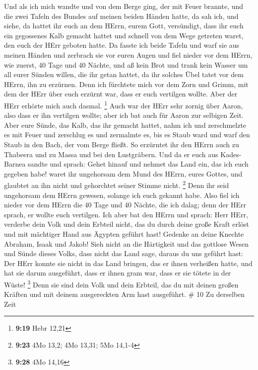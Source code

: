  Und als ich mich wandte und von dem Berge ging, der mit
Feuer brannte, und die zwei Tafeln des Bundes auf meinen beiden Händen
hatte,  da sah ich, und siehe, da hattet ihr euch an dem
HErrn, eurem Gott, versündigt, dass ihr euch ein gegossenes Kalb gemacht
hattet und schnell von dem Wege getreten waret, den euch der HErr
geboten hatte.  Da fasste ich beide Tafeln und warf sie aus
meinen Händen und zerbrach sie vor euren Augen  und fiel
nieder vor dem HErrn, wie zuerst, 40 Tage und 40 Nächte, und aß kein
Brot und trank kein Wasser um all eurer Sünden willen, die ihr getan
hattet, da ihr solches Übel tatet vor dem HErrn, ihn zu erzürnen.
 Denn ich fürchtete mich vor dem Zorn und Grimm, mit dem
der HErr über euch erzürnt war, dass er euch vertilgen wollte. Aber der
HErr erhörte mich auch dasmal. \footnote{\textbf{9:19} Hebr 12,21}
 Auch war der HErr sehr zornig über Aaron, also dass er ihn
vertilgen wollte; aber ich bat auch für Aaron zur selbigen Zeit.
 Aber eure Sünde, das Kalb, das ihr gemacht hattet, nahm
ich und zerschmelzte es mit Feuer und zerschlug es und zermalmte es, bis
es Staub ward und warf den Staub in den Bach, der vom Berge fließt.
 So erzürntet ihr den HErrn auch zu Thabeera und zu Massa
und bei den Lustgräbern.  Und da er euch aus Kades-Barnea
sandte und sprach: Gehet hinauf und nehmet das Land ein, das ich euch
gegeben habe! waret ihr ungehorsam dem Mund des HErrn, eures Gottes, und
glaubtet an ihn nicht und gehorchtet seiner Stimme nicht. \footnote{\textbf{9:23}
  4Mo 13,2; 4Mo 13,31; 5Mo 14,1-4}  Denn ihr seid
ungehorsam dem HErrn gewesen, solange ich euch gekannt habe.
 Also fiel ich nieder vor dem HErrn die 40 Tage und 40
Nächte, die ich dalag; denn der HErr sprach, er wollte euch vertilgen.
 Ich aber bat den HErrn und sprach: Herr HErr, verderbe
dein Volk und dein Erbteil nicht, das du durch deine große Kraft erlöst
und mit mächtiger Hand aus Ägypten geführt hast!  Gedenke
an deine Knechte Abraham, Isaak und Jakob! Sieh nicht an die Härtigkeit
und das gottlose Wesen und Sünde dieses Volks,  dass nicht
das Land sage, daraus du uns geführt hast: Der HErr konnte sie nicht in
das Land bringen, das er ihnen verheißen hatte, und hat sie darum
ausgeführt, dass er ihnen gram war, dass er sie tötete in der Wüste!
\footnote{\textbf{9:28} 4Mo 14,16}  Denn sie sind dein Volk
und dein Erbteil, das du mit deinen großen Kräften und mit deinem
ausgereckten Arm hast ausgeführt. \# 10  Zu derselben Zeit
